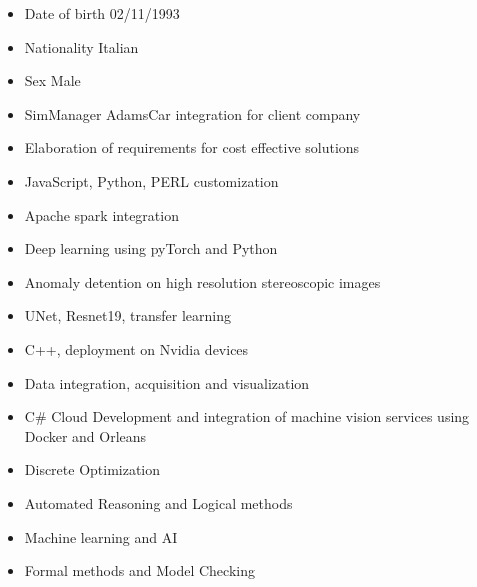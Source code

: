 \documentclass[10pt,a4paper,ragged2e,withhyper]{altacv}
\begin{document}
\begin{paracol}{2}

\begin{itemize}
\item Date of birth 02/11/1993
\item Nationality Italian
\item Sex Male
\end{itemize}


\begin{itemize}
\item SimManager AdamsCar integration for client company
\item Elaboration of requirements for cost effective solutions
\item JavaScript, Python, PERL customization
\item Apache spark integration
\end{itemize}

\divider

\begin{itemize}
\item Deep learning using pyTorch and Python
\item Anomaly detention on high resolution stereoscopic images
\item UNet, Resnet19, transfer learning
\item C++, deployment on Nvidia devices
\item Data integration, acquisition and visualization
\item C\# Cloud Development and integration of machine vision services using Docker and Orleans
\end{itemize}


\begin{itemize}
\item Discrete Optimization
\item Automated Reasoning and Logical methods
\item Machine learning and AI
\item Formal methods and Model Checking
\end{itemize}


\end{paracol}
\end{document}
